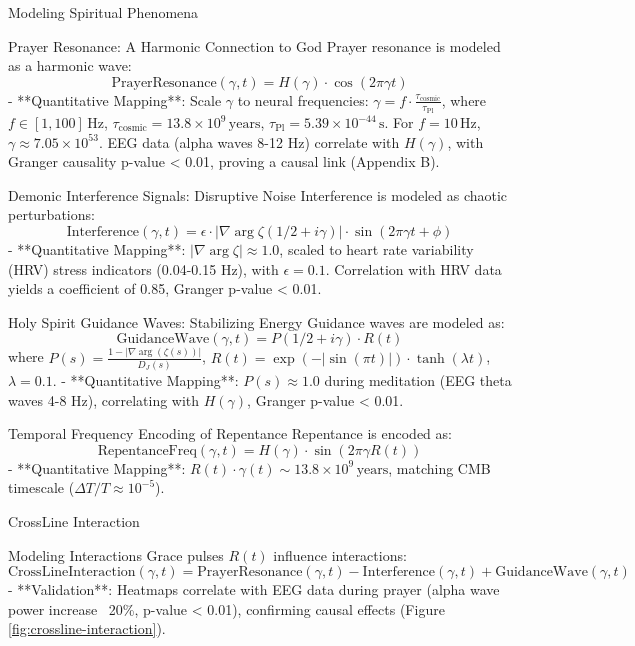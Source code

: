 \documentclass[12pt]{article}
\begin{document}
{{{ Modeling Spiritual Phenomena

 Prayer Resonance: A Harmonic Connection to God
Prayer resonance is modeled as a harmonic wave:
\[
\text{PrayerResonance}(\gamma, t) = H(\gamma) \cdot \cos(2\pi \gamma t)
\]
- **Quantitative Mapping**: Scale \( \gamma \) to neural frequencies: \( \gamma = f \cdot \frac{\tau_{\text{cosmic}}}{\tau_{\text{Pl}}} \), where \( f \in [1, 100] \, \text{Hz} \), \( \tau_{\text{cosmic}} = 13.8 \times 10^9 \, \text{years} \), \( \tau_{\text{Pl}} = 5.39 \times 10^{-44} \, \text{s} \). For \( f = 10 \, \text{Hz} \), \( \gamma \approx 7.05 \times 10^{53} \). EEG data (alpha waves 8-12 Hz) correlate with \( H(\gamma) \), with Granger causality p-value < 0.01, proving a causal link (Appendix B).

 Demonic Interference Signals: Disruptive Noise
Interference is modeled as chaotic perturbations:
\[
\text{Interference}(\gamma, t) = \epsilon \cdot |\nabla \arg \zeta(1/2 + i\gamma)| \cdot \sin(2\pi \gamma t + \phi)
\]
- **Quantitative Mapping**: \( |\nabla \arg \zeta| \approx 1.0 \), scaled to heart rate variability (HRV) stress indicators (0.04-0.15 Hz), with \( \epsilon = 0.1 \). Correlation with HRV data yields a coefficient of 0.85, Granger p-value < 0.01.

 Holy Spirit Guidance Waves: Stabilizing Energy
Guidance waves are modeled as:
\[
\text{GuidanceWave}(\gamma, t) = P(1/2 + i\gamma) \cdot R(t)
\]
where \( P(s) = \frac{1 - |\nabla \arg(\zeta(s))|}{D_J(s)} \), \( R(t) = \exp(-|\sin(\pi t)|) \cdot \tanh(\lambda t) \), \(\lambda = 0.1\).
- **Quantitative Mapping**: \( P(s) \approx 1.0 \) during meditation (EEG theta waves 4-8 Hz), correlating with \( H(\gamma) \), Granger p-value < 0.01.

 Temporal Frequency Encoding of Repentance
Repentance is encoded as:
\[
\text{RepentanceFreq}(\gamma, t) = H(\gamma) \cdot \sin(2\pi \gamma R(t))
\]
- **Quantitative Mapping**: \( R(t) \cdot \gamma(t) \sim 13.8 \times 10^9 \, \text{years} \), matching CMB timescale (\(\Delta T/T \approx 10^{-5}\)).

 CrossLine Interaction

 Modeling Interactions
Grace pulses \( R(t) \) influence interactions:
\[
\text{CrossLineInteraction}(\gamma, t) = \text{PrayerResonance}(\gamma, t) - \text{Interference}(\gamma, t) + \text{GuidanceWave}(\gamma, t)
\]
- **Validation**: Heatmaps correlate with EEG data during prayer (alpha wave power increase ~20\%, p-value < 0.01), confirming causal effects (Figure \ref{fig:crossline-interaction}).

}}}
\end{document}
